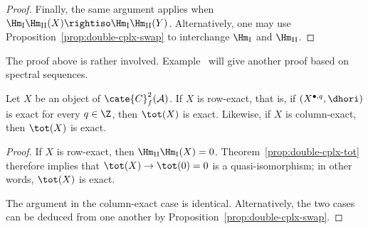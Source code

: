 \begin{proof}
	Finally, the same argument applies when
	$\Hm_{\mathrm{I}}\Hm_{\mathrm{II}}(X)\rightiso
	\Hm_{\mathrm{I}}\Hm_{\mathrm{II}}(Y)$. Alternatively, one may use
	Proposition~\ref{prop:double-cplx-swap} to interchange
	$\Hm_{\mathrm{I}}$ and $\Hm_{\mathrm{II}}$.
\end{proof}

The proof above is rather involved. Example~
will give another proof based on spectral sequences.

\begin{corollary}\label{prop:acyclic-assembly}
	Let $X$ be an object of $\cate{C}_f^2(\mathcal{A})$. If $X$ is row-exact,
	that is, if $\left(X^{\bullet,q},\dhori\right)$ is exact for every
	$q\in\Z$, then $\tot(X)$ is exact. Likewise, if $X$ is column-exact, then
	$\tot(X)$ is exact.
\end{corollary}
\begin{proof}
	If $X$ is row-exact, then
	$\Hm_{\mathrm{II}}\Hm_{\mathrm{I}}(X)=0$. Theorem~\ref{prop:double-cplx-tot}
	therefore implies that $\tot(X)\to\tot(0)=0$ is a quasi-isomorphism; in
	other words, $\tot(X)$ is exact.

	The argument in the column-exact case is identical. Alternatively, the two
	cases can be deduced from one another by
	Proposition~\ref{prop:double-cplx-swap}.
\end{proof}
